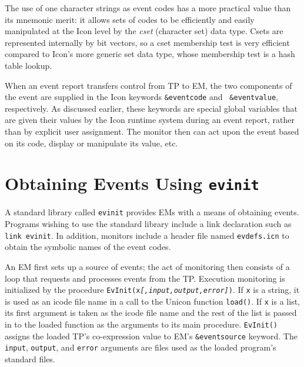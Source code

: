 The use of one character strings as event codes has a more practical
value than its mnemonic merit: it allows sets of codes to be
efficiently and easily manipulated at the Icon level by the {\em cset\/}
(character set) data type.  Csets are represented internally by bit
vectors, so a cset membership test is very efficient compared to
Icon's more generic set data type, whose membership test is a hash
table lookup.

When an event report transfers control from TP to EM, the two components of
the event are supplied in the Icon keywords {\tt \&eventcode} and {\tt
\&eventvalue}, respectively.
As discussed earlier, these
keywords are special global variables that are given their values by the
Icon runtime system during an event report, rather than by explicit user
assignment.  The monitor then
can act upon the event based on its code, display or manipulate its value,
etc.


\section{Obtaining Events Using {\tt evinit}}

A standard library called {\tt evinit} provides EMs with
a means of obtaining events.  Programs wishing to use the
standard library include a link declaration such as {\tt link
evinit}.
In addition, monitors include a header file named {\tt evdefs.icn}
to obtain the symbolic names of the event codes.

\vspace{1pc}


\vspace{0.25pc}
\noindent
An EM first sets up a source of events; the act of monitoring then
consists of a loop that requests and processes events from the TP.
Execution monitoring is initialized by the procedure
{\tt EvInit(x{\em [,input,output,error]\/})}.  If {\tt x} is a string, it is
used as an icode file name in a call to the Unicon function {\tt load()}.
If {\tt x} is a list, its first argument is taken as the icode file name
and the rest of the list is passed in to the loaded function as the
arguments to its main procedure.
{\tt EvInit()} assigns the loaded
TP's co-expression value to EM's {\tt \&eventsource} keyword.
The {\tt input}, {\tt output}, and {\tt error} arguments are files
used as the loaded program's standard files.

